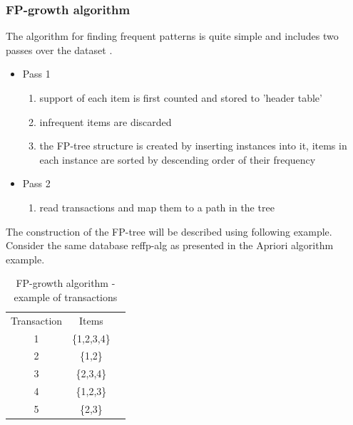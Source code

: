 \subsubsection{FP-growth algorithm}
The algorithm for finding frequent patterns is quite simple and includes two passes over the dataset \cite{fp-growth}.
\begin{itemize}
	\item Pass 1
	\begin{enumerate}
		\item support of each item is first counted and stored to 'header table' 
		\item infrequent items are discarded
		\item the FP-tree structure is created by inserting instances into it, items in each instance are sorted by descending order of their frequency
	\end{enumerate}
	\item Pass 2
	\begin{enumerate}
		\item read transactions and map them to a path in the tree
	\end{enumerate}
\end{itemize}
The construction of the FP-tree will be described using following example.
Consider the same database ref{fp-alg} as presented in the Apriori algorithm example.
\begin{table}[H]
	\centering
	\caption{FP-growth algorithm - example of transactions}
	\label{apriori-1}
	\begin{tabular}{|c|c|l}
		\cline{1-2}
		Transaction & Items       &  \\ \cline{1-2}
		1           & \{1,2,3,4\} &  \\ \cline{1-2}
		2           & \{1,2\}     &  \\ \cline{1-2}
		3           & \{2,3,4\}   &  \\ \cline{1-2}
		4           & \{1,2,3\}   &  \\ \cline{1-2}
		5           & \{2,3\}     &  \\ \cline{1-2}
	\end{tabular}
\end{table}

